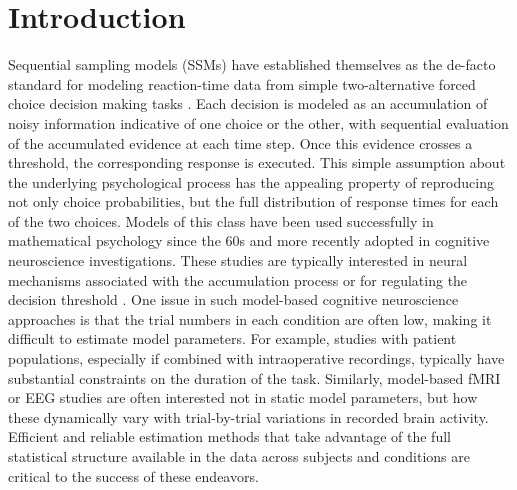 \documentclass[letterpaper,10pt,english]{article}
\begin{document}
\section*{Introduction}
\label{intro:introduction}\label{intro:index-0}\label{intro:chap-introduction}\label{intro::doc}
Sequential sampling models (SSMs) \citep{TownsendAshby83} have established themselves as the de-facto standard for modeling reaction-time data from simple two-alternative forced choice decision making tasks \citep{SmithRatcliff04}. Each decision is modeled as an accumulation of noisy information indicative of one choice or the other, with sequential evaluation of the accumulated evidence at each time step. Once this evidence crosses a threshold, the corresponding response is executed. This simple assumption about the underlying psychological process has the appealing property of reproducing not only choice probabilities, but the full distribution of response times for each of the two choices. Models of this class have been used successfully in mathematical psychology since the 60s and more recently adopted in cognitive neuroscience investigations. These studies are typically interested in neural mechanisms associated with the accumulation process or for regulating the decision threshold \citep[e.g.][]{ForstmannDutilhBrownEtAl08,CavanaghWieckiCohenEtAl11,RatcliffPhiliastidesSajda09}. One issue in such model-based cognitive neuroscience approaches is that the trial numbers in each condition are often low, making it difficult to estimate model parameters. For example, studies with patient populations, especially if combined with intraoperative recordings, typically have substantial constraints on the duration of the task. Similarly, model-based fMRI or EEG studies are often interested not in static model parameters, but how these dynamically vary with trial-by-trial variations in recorded brain activity. Efficient and reliable estimation methods that take advantage of the full statistical structure available in the data across subjects and conditions are critical to the success of these endeavors.
\end{document}
